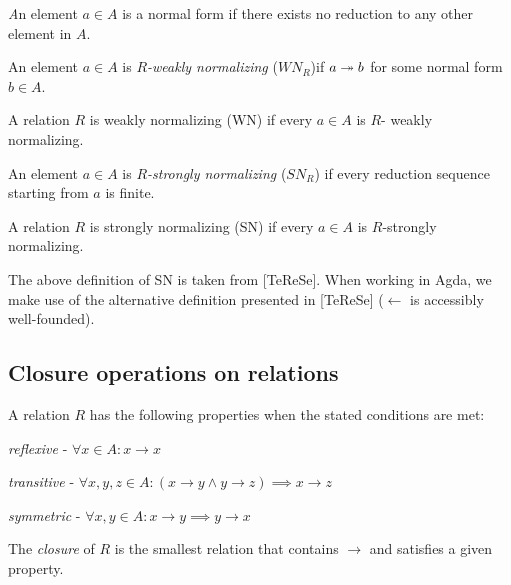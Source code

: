 \documentclass{scrartcl}
\begin{document}
\begin{dfn}
  \emph An element $a \in A$ is a {normal form} if there exists no reduction to any other element in $A$.
\end{dfn}

\begin{dfn}
  An element $a \in A$ is \emph{$R$-weakly normalizing} ($WN_{R}$)if $a \twoheadrightarrow b$ for some normal form $b \in A$.

  A relation $R$ is weakly normalizing (WN) if every $a \in A$ is $R$- weakly normalizing.
\end{dfn}

\begin{dfn}
  An element $a \in A$ is \emph{$R$-strongly normalizing} ($SN_R$) if every reduction sequence starting from $a$ is finite.

  A relation $R$ is strongly normalizing (SN) if every
  $a \in A$ is $R$-strongly normalizing.
\end{dfn}

The above definition of SN is taken from [TeReSe]. When working in Agda, we make use of the alternative definition presented in [TeReSe] ($\leftarrow$ is accessibly well-founded).

\subsection{Closure operations on relations}

A relation $R$ has the following properties when the stated conditions are met:
\begin{dfn}
  \emph{reflexive} {- $\forall x \in A : x \to x $}
\end{dfn}
\begin{dfn}
  \emph{transitive} {- $\forall x, y, z \in A : ( x \to y \land y \to z ) \implies x \to z $}
\end{dfn}
\begin{dfn}
  \emph{symmetric} {- $\forall x, y \in A : x \to y \implies y \to x$}
\end{dfn}

\begin{dfn}
  The \emph{closure} of $R$ is the smallest relation that contains $\to$ and satisfies a given property.
\end{dfn}
\end{document}
